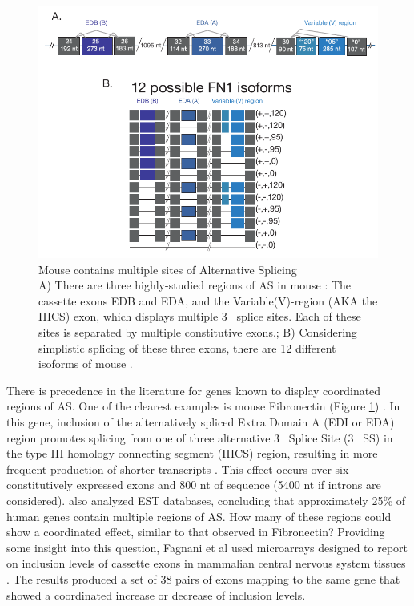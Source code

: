 \begin{figure}[htbp]
	\centering 
	\includegraphics{Figures/Fibronectin.pdf}
	\caption[Mouse \fn{} contains multipe sites of Alternative Splicing]
	{
		Mouse \fn{} contains multiple sites of Alternative Splicing\\[0.25cm]
		A) There are three highly-studied regions of AS in mouse \fn{}: The cassette exons EDB and EDA, and the Variable(V)-region (AKA the IIICS) exon, which displays multiple 3\textprime~ splice sites.  Each of these sites is separated by multiple constitutive exons.; B) Considering simplistic splicing of these three exons, there are 12 different isoforms of mouse \fn{}.
	}
	\label{fig:mouseFn1}
\end{figure}

There is precedence in the literature for genes known to display coordinated regions of AS. One of the clearest examples is mouse Fibronectin \fn{} (Figure \ref{fig:mouseFn1}) \citep{Schwarzbauer1983, White2011a}. In this gene, inclusion of the alternatively spliced Extra Domain A (EDI or EDA) region promotes splicing from one of three alternative 3\textprime~ Splice Site (3\textprime~ SS) in the type III homology connecting segment (IIICS) region, resulting in more frequent production of shorter transcripts \citep{Fededa2005}. This effect occurs over six constitutively expressed exons and 800 nt of sequence (5400 nt if introns are considered). \citep{Fededa2005} also analyzed EST databases, concluding that approximately 25\% of human genes contain multiple regions of AS. How many of these regions could show a coordinated effect, similar to that observed in Fibronectin? Providing some insight into this question, Fagnani et al used microarrays designed to report on inclusion levels of cassette exons in mammalian central nervous system tissues \citep{Fagnani2007}. The results produced a set of 38 pairs of exons mapping to the same gene that showed a coordinated increase or decrease of inclusion levels. 

